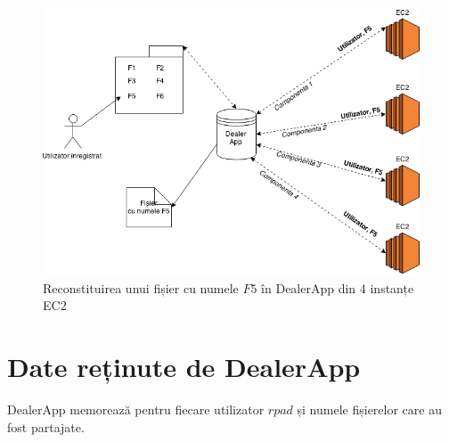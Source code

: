 \documentclass[oneside, 12pt]{book}
\begin{document}
\begin{figure}
	\begin{center}
	\includegraphics[width=1\textwidth]{img/DealerApp_Reconstruction.png}
	\caption{Reconstituirea unui fișier cu numele $F5$ în DealerApp din $4$ instanțe EC2}
	\label{fig:dealerapp_reconstruction}
	\end{center}
	\bigskip
\end{figure}



\section{Date reținute de DealerApp}

DealerApp memorează pentru fiecare utilizator $rpad$ și numele fișierelor care au fost partajate.
\end{document}
